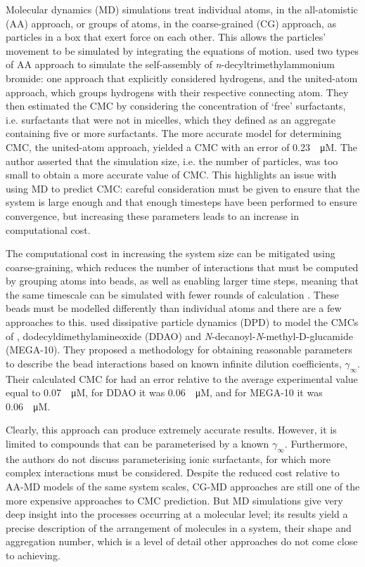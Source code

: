 Molecular dynamics (MD) simulations treat individual atoms, in the all-atomistic
(AA) approach, or groups of atoms, in the coarse-grained (CG) approach, as
particles in a box that exert force on each other. This allows the particles'
movement to be simulated by integrating the equations of motion.
\citet{jorgeMolecularDynamicsSimulation2008} used two types of AA approach to
simulate the self-assembly of \textit{n}-decyltrimethylammonium bromide: one
approach that explicitly considered hydrogens, and the united-atom approach, which
groups hydrogens with their respective connecting atom. They then estimated the
CMC by considering the concentration of `free' surfactants, i.e. surfactants
that were not in micelles, which they defined as an aggregate containing five or
more surfactants. The more accurate model for determining CMC, the united-atom
approach, yielded a CMC with an error of \SI{0.23}{\log \micro M}. The author
asserted that the simulation size, i.e. the number of particles, was too small
to obtain a more accurate value of CMC. This highlights an issue with using MD
to predict CMC: careful consideration must be given to ensure that the system is
large enough and that enough timesteps have been performed to ensure
convergence, but increasing these parameters leads to an increase in
computational cost.

The computational cost in increasing the system size can be mitigated using
coarse-graining, which reduces the number of interactions that must be computed
by grouping atoms into beads, as well as enabling larger time steps, meaning
that the same timescale can be simulated with fewer rounds of calculation
\cite{fitzgeraldMultiscaleModelingNanomaterials2015}. These beads must be
modelled differently than individual atoms and there are a few approaches to
this. \citet{vishnyakovPredictionCriticalMicelle2013} used dissipative particle
dynamics (DPD) to model the CMCs of , dodecyldimethylamineoxide (DDAO)
and \textit{N}-decanoyl-\textit{N}-methyl-\textsc{D}-glucamide (MEGA-10). They
proposed a methodology for obtaining reasonable parameters to describe the bead
interactions based on known infinite dilution coefficients, $\gamma_\infty$.
Their calculated CMC for  had an error relative to the average
experimental value equal to \SI{0.07}{\log \micro M}, for DDAO it was
\SI{0.06}{\log \micro M}, and for MEGA-10 it was \SI{0.06}{\log \micro M}.

Clearly, this approach can produce extremely accurate results. However, it is
limited to compounds that can be parameterised by a known $\gamma_\infty$.
Furthermore, the authors do not discuss parameterising ionic surfactants, for
which more complex interactions must be considered. Despite the reduced cost
relative to AA-MD models of the same system scales, CG-MD approaches are still
one of the more expensive approaches to CMC prediction. But MD simulations give
very deep insight into the processes occurring at a molecular level; its results
yield a precise description of the arrangement of molecules in a system, their
shape and aggregation number, which is a level of detail other approaches do not
come close to achieving.

